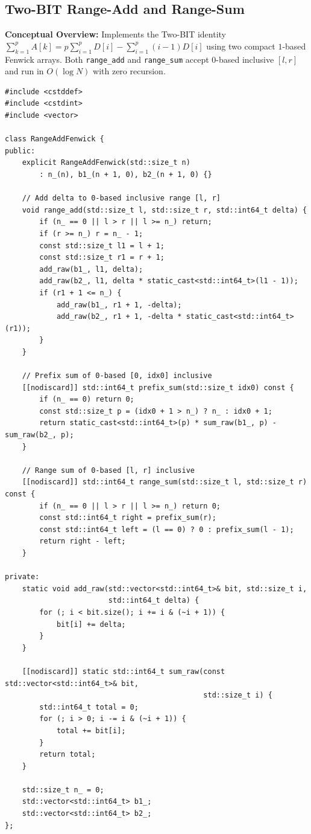 \documentclass[11pt,a4paper]{article}
\theoremstyle{definition}
\begin{document}
\subsection{Two-BIT Range-Add and Range-Sum}

\textbf{Conceptual Overview:} Implements the Two-BIT identity $\sum_{k=1}^{p} A[k] = p \sum_{i=1}^{p} D[i] - \sum_{i=1}^{p} (i - 1) D[i]$ using two compact $1$-based Fenwick arrays. Both \texttt{range\_add} and \texttt{range\_sum} accept $0$-based inclusive $[l, r]$ and run in $O(\log N)$ with zero recursion.

\begin{lstlisting}[caption={Two-BIT structure supporting $O(\log N)$ range additions and range sum queries.}]
#include <cstddef>
#include <cstdint>
#include <vector>

class RangeAddFenwick {
public:
    explicit RangeAddFenwick(std::size_t n)
        : n_(n), b1_(n + 1, 0), b2_(n + 1, 0) {}

    // Add delta to 0-based inclusive range [l, r]
    void range_add(std::size_t l, std::size_t r, std::int64_t delta) {
        if (n_ == 0 || l > r || l >= n_) return;
        if (r >= n_) r = n_ - 1;
        const std::size_t l1 = l + 1;
        const std::size_t r1 = r + 1;
        add_raw(b1_, l1, delta);
        add_raw(b2_, l1, delta * static_cast<std::int64_t>(l1 - 1));
        if (r1 + 1 <= n_) {
            add_raw(b1_, r1 + 1, -delta);
            add_raw(b2_, r1 + 1, -delta * static_cast<std::int64_t>(r1));
        }
    }

    // Prefix sum of 0-based [0, idx0] inclusive
    [[nodiscard]] std::int64_t prefix_sum(std::size_t idx0) const {
        if (n_ == 0) return 0;
        const std::size_t p = (idx0 + 1 > n_) ? n_ : idx0 + 1;
        return static_cast<std::int64_t>(p) * sum_raw(b1_, p) - sum_raw(b2_, p);
    }

    // Range sum of 0-based [l, r] inclusive
    [[nodiscard]] std::int64_t range_sum(std::size_t l, std::size_t r) const {
        if (n_ == 0 || l > r || l >= n_) return 0;
        const std::int64_t right = prefix_sum(r);
        const std::int64_t left = (l == 0) ? 0 : prefix_sum(l - 1);
        return right - left;
    }

private:
    static void add_raw(std::vector<std::int64_t>& bit, std::size_t i,
                        std::int64_t delta) {
        for (; i < bit.size(); i += i & (~i + 1)) {
            bit[i] += delta;
        }
    }

    [[nodiscard]] static std::int64_t sum_raw(const std::vector<std::int64_t>& bit,
                                              std::size_t i) {
        std::int64_t total = 0;
        for (; i > 0; i -= i & (~i + 1)) {
            total += bit[i];
        }
        return total;
    }

    std::size_t n_ = 0;
    std::vector<std::int64_t> b1_;
    std::vector<std::int64_t> b2_;
};
\end{lstlisting}
\end{document}

